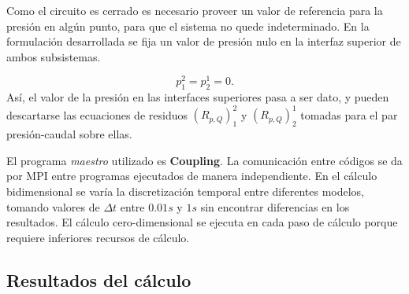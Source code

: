 
Como el circuito es cerrado es necesario proveer un valor de referencia para la presión en algún punto, para que el sistema no quede indeterminado.
En la formulación desarrollada se fija un valor de presión nulo en la interfaz superior de ambos subsistemas.

\begin{equation*}
p_1^2 = p_2^1 = 0.
\end{equation*}
Así, el valor de la presión en las interfaces superiores pasa a ser dato,
y pueden descartarse las ecuaciones de residuos $(R_{p,Q})_{1}^{2}$ y $(R_{p,Q})_{2}^{1}$ tomadas para el par presión-caudal sobre ellas.

El programa \textit{maestro} utilizado es \textbf{Coupling}.
La comunicación entre códigos se da por MPI entre programas ejecutados de manera independiente.
En el cálculo bidimensional se varía la discretización temporal entre diferentes modelos, tomando valores de $\Delta t$ entre $0.01s$ y $1s$ sin encontrar diferencias en los resultados.
El cálculo cero-dimensional se ejecuta en cada paso de cálculo porque requiere inferiores recursos de cálculo.

\subsection*{Resultados del cálculo}

